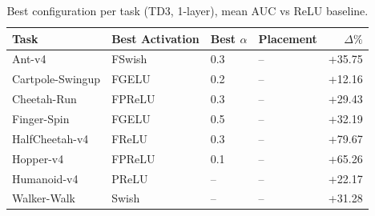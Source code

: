 \begin{table}[t]
\centering
\caption{Best configuration per task (TD3, 1-layer), mean AUC vs ReLU baseline.}
\label{tab:winner-td3-1-meanauc-relur}
\begin{tabular}{llllr}
\toprule
Task & Best Activation & Best $\alpha$ & Placement & $\Delta\%$ \\
\midrule
Ant-v4 & FSwish & 0.3 & -- & +35.75 \\
Cartpole-Swingup & FGELU & 0.2 & -- & +12.16 \\
Cheetah-Run & FPReLU & 0.3 & -- & +29.43 \\
Finger-Spin & FGELU & 0.5 & -- & +32.19 \\
HalfCheetah-v4 & FReLU & 0.3 & -- & +79.67 \\
Hopper-v4 & FPReLU & 0.1 & -- & +65.26 \\
Humanoid-v4 & PReLU & -- & -- & +22.17 \\
Walker-Walk & Swish & -- & -- & +31.28 \\
\bottomrule
\end{tabular}
\end{table}
